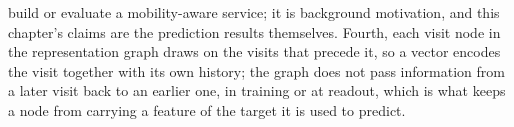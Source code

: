 build or evaluate a mobility-aware service; it is background motivation, and this chapter's claims are the
prediction results themselves.
Fourth, each
visit node in the representation graph draws on the visits that precede it, so a vector encodes the visit
together with its own history; the graph does not pass information from a later visit back to an earlier
one, in training or at readout, which is what keeps a node from carrying a feature of the target it is
used to predict.
